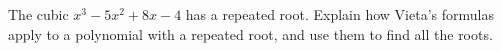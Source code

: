 The cubic $x^3-5x^2+8x-4$ has a repeated root. Explain how Vieta's formulas apply to a polynomial with a repeated root, and use them to find all the roots.
